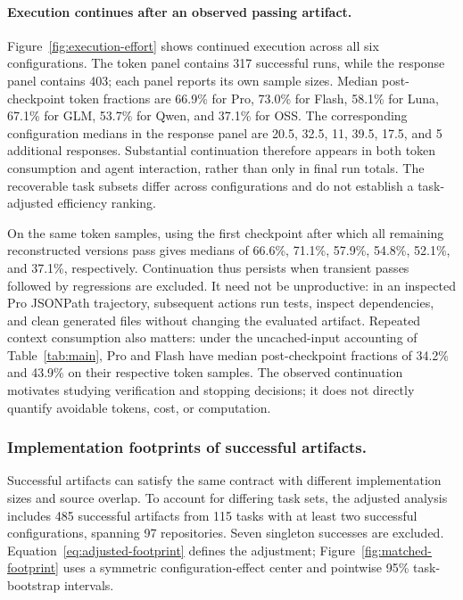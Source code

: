 \documentclass[acmsmall,screen,review,anonymous]{acmart}
\begin{document}
\paragraph{Execution continues after an observed passing artifact.}
Figure~\ref{fig:execution-effort} shows continued execution across all six
configurations. The token panel contains 317 successful runs, while the response
panel contains 403; each panel reports its own sample sizes. Median
post-checkpoint token fractions are 66.9\% for Pro, 73.0\% for Flash, 58.1\%
for Luna, 67.1\% for GLM, 53.7\% for Qwen, and 37.1\% for OSS. The corresponding
configuration medians in the response panel are 20.5, 32.5, 11, 39.5, 17.5, and
5 additional responses. Substantial continuation therefore appears in both
token consumption and agent interaction, rather than only in final run totals.
The recoverable task subsets differ across configurations and do not establish
a task-adjusted efficiency ranking.



On the same token samples, using the first checkpoint after which all remaining
reconstructed versions pass gives medians of 66.6\%, 71.1\%, 57.9\%, 54.8\%,
52.1\%, and 37.1\%, respectively. Continuation thus persists when transient
passes followed by regressions are excluded. It need not be unproductive: in
an inspected Pro JSONPath trajectory, subsequent actions run tests, inspect
dependencies, and clean generated files without changing the evaluated artifact.
Repeated context consumption also matters: under the uncached-input accounting
of Table~\ref{tab:main}, Pro and Flash have median post-checkpoint fractions of
34.2\% and 43.9\% on their respective token samples. The observed continuation
motivates studying verification and stopping decisions; it does not directly
quantify avoidable tokens, cost, or computation.

\subsubsection{Implementation footprints of successful artifacts.}
\label{sec:footprint-results}

Successful artifacts can satisfy the same contract with different implementation
sizes and source overlap. To account for differing task sets, the adjusted
analysis includes 485 successful artifacts from 115 tasks with at least two
successful configurations, spanning 97 repositories. Seven singleton successes
are excluded. Equation~\ref{eq:adjusted-footprint} defines the adjustment;
Figure~\ref{fig:matched-footprint} uses a symmetric configuration-effect center
and pointwise 95\% task-bootstrap intervals.
\end{document}
